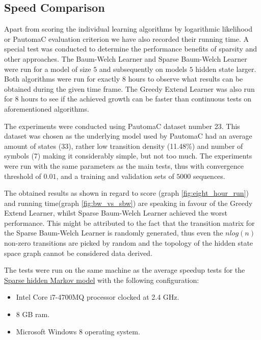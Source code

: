 \subsection{Speed Comparison}
\label{sec:speedrun}
Apart from scoring the individual learning algorithms by logarithmic likelihood or PautomaC evaluation criterion we have also recorded their running time. A special test was conducted to determine the performance benefits of sparsity and other approaches. The Baum-Welch Learner and Sparse Baum-Welch Learner were run for a model of size $5$ and subsequently on models $5$ hidden state larger. Both algorithms were run for exactly 8 hours to observe what results can be obtained during the given time frame. The Greedy Extend Learner was also run for 8 hours to see if the achieved growth can be faster than continuous tests on aforementioned algorithms.

The experiments were conducted using PautomaC dataset number 23. This dataset was chosen as the underlying model used by PautomaC had an average amount of states (33), rather low transition density (11.48\%) and number of symbols (7) making it considerably simple, but not too much. The experiments were run with the same parameters as the main tests, thus with convergence threshold of $0.01$, and a training and validation sets of $5000$ sequences.

The obtained results as shown in regard to score (graph \ref{fig:eight_hour_run}) and running time(graph \ref{fig:bw_vs_sbw}) are speaking in favour of the Greedy Extend Learner, whilst Sparse Baum-Welch Learner achieved the worst performance. This might be attributed to the fact that the transition matrix for the Sparse Baum-Welch Learner is randomly generated, thus even the $nlog(n)$ non-zero transitions are picked by random and the topology of the hidden state space graph cannot be considered data derived.

The tests were run on the same machine as the average speedup tests for the \hyperref[sec:shmm]{Sparse hidden Markov model} with the following configuration:
\begin{itemize}
	\item[] Intel Core i7-4700MQ processor clocked at 2.4 GHz.
	\item[] 8 GB \gls{ram}.
	\item[] Microsoft Windows 8 operating system.
\end{itemize}

